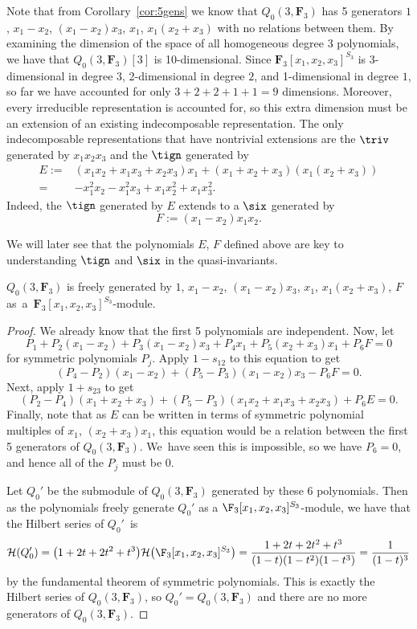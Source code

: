  \begin{Example}%
 Note that from Corollary~\ref{cor:5gens} we know that $Q_0(3,\mathbf{F}_3)$ has 5 generators $1$, $x_1-x_2$, $(x_1-x_2)x_3$, $x_1$, $x_1(x_2+x_3)$ with no relations between them. By examining the dimension of the space of all homogeneous degree 3 polynomials, we have that $Q_0(3,\mathbf{F}_3)[3]$ is 10-dimensional. Since $\mathbf{F}_3[x_1,x_2,x_3]^{S_3}$ is 3-dimensional in degree $3$, 2-dimensional in degree $2$, and 1-dimensional in degree $1$, so far we have accounted for only $3+2+2+1+1=9$ dimensions. Moreover, every irreducible representation is accounted for, so this extra dimension must be an extension of an existing indecomposable representation. The only indecomposable representations that have nontrivial extensions are the $\triv$ generated by $x_1x_2x_3$ and the $\tign$ generated by
 \begin{align*}
 E :={}& (x_1x_2+x_1x_3+x_2x_3)x_1+(x_1+x_2+x_3)(x_1(x_2+x_3))\\
 ={}& {-}x_1^2x_2-x_1^2x_3+x_1x_2^2+x_1x_3^2.
 \end{align*}
 Indeed, the $\tign$ generated by $E$ extends to a $\six$ generated by
 \[F:=(x_1-x_2)x_1x_2.\]
 \end{Example}

 We will later see that the polynomials $E$, $F$ defined above are key to understanding $\tign$ and $\six$ in the quasi-invariants.

 \begin{Proposition}\label{prop:q0}
 $Q_0(3,\mathbf{F}_3)$ is freely generated by $1$, $x_1-x_2$, $(x_1-x_2)x_3$, $x_1$, $x_1(x_2+x_3)$, $F$ as~a~$\mathbf{F}_3[x_1,x_2,x_3]^{S_3}$-module.
 \end{Proposition}
 \begin{proof}
 We already know that the first 5 polynomials are independent. Now, let
 \[P_1+P_2(x_1-x_2)+P_3(x_1-x_2)x_3+P_4x_1+P_5(x_2+x_3)x_1+P_6F=0\]
 for symmetric polynomials $P_j$. Apply $1-s_{12}$ to this equation to get
 \[(P_4-P_2)(x_1-x_2)+(P_5-P_3)(x_1-x_2)x_3-P_6F=0.\]
 Next, apply $1+s_{23}$ to get
 \[(P_2-P_4)(x_1+x_2+x_3)+(P_5-P_3)(x_1x_2+x_1x_3+x_2x_3)+P_6E=0.\]
 Finally, note that as $E$ can be written in terms of symmetric polynomial multiples of $x_1$, ${(x_2+x_3)x_1}$, this equation would be a relation between the first 5 generators of $Q_0(3,\mathbf{F}_3)$. We~have seen this is impossible, so we have $P_6=0$, and hence all of the $P_j$ must be 0.

 Let $Q_0'$ be the submodule of $Q_0(3,\mathbf{F}_3)$ generated by these 6 polynomials. Then as the polynomials freely generate $Q_0'$ as a $\F_3[x_1,x_2,x_3]^{S_3}$-module, we have that the Hilbert series of $Q_0'$~is
 \[\mathcal{H}(Q_0')=\big(1+2t+2t^2+t^3\big)\mathcal{H}\big(\F_3[x_1,x_2,x_3]^{S_3}\big)=\frac{1+2t+2t^2+t^3}{(1-t)(1-t^2)(1-t^3)}=\frac{1}{(1-t)^3}\]
 by the fundamental theorem of symmetric polynomials. This is exactly the Hilbert series of $Q_0(3,\mathbf{F}_3)$, so $Q_0'=Q_0(3,\mathbf{F}_3)$ and there are no more generators of $Q_0(3,\mathbf{F}_3)$.
 \end{proof}

